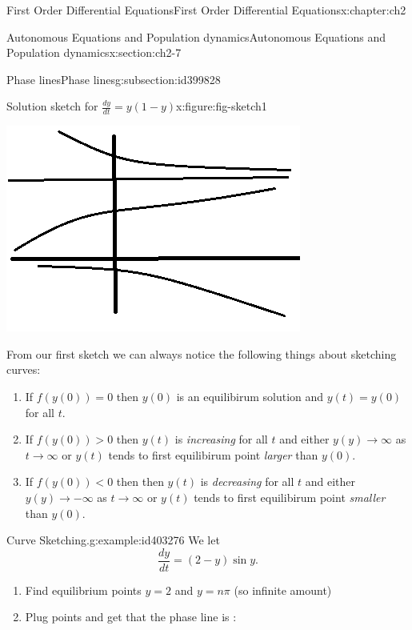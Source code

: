 \documentclass[oneside,10pt,]{book}
\numberwithin{equation}{section}
\numberwithin{equation}{section}
\newcommand{\lt}{<}
\begin{document}
\begin{chapterptx}{First Order Differential Equations}{}{First Order Differential Equations}{}{}{x:chapter:ch2}
\begin{sectionptx}{Autonomous Equations and Population dynamics}{}{Autonomous Equations and Population dynamics}{}{}{x:section:ch2-7}
\begin{subsectionptx}{Phase lines}{}{Phase lines}{}{}{g:subsection:id399828}
\begin{figureptx}{Solution sketch for \(\frac{dy}{dt} = y(1-y)\)}{x:figure:fig-sketch1}{}
\begin{image}{0.3}{0.4}{0.3}
\includegraphics[width=\linewidth]{images/1.6-Sketch1.png}
\end{image}%
\tcblower
\end{figureptx}%
%
\par
From our first sketch we can always notice the following things about sketching curves:%
%
\begin{enumerate}
\item{}If \(f(y(0))=0\) then \(y(0)\) is an equilibirum solution and \(y(t)=y(0)\) for all \(t\).%
\item{}If \(f(y(0))>0\) then \(y(t)\) is \emph{increasing} for all \(t\) and either \(y(y)\to\infty\) as \(t\to\infty\) or \(y(t)\) tends to first equilibirum point \emph{larger} than \(y(0).\)%
\item{}If \(f(y(0))
\lt 0\) then then \(y(t)\) is \emph{decreasing} for all \(t\) and either \(y(y)\to-\infty\) as \(t\to\infty\) or \(y(t)\) tends to first equilibirum point \emph{smaller} than \(y(0).\)%
\end{enumerate}
\begin{example}{Curve Sketching.}{g:example:id403276}%
We let%
\begin{equation*}
\frac{dy}{dt}=(2-y)\sin y.
\end{equation*}
%
%
\begin{enumerate}
\item{}Find equilibrium points \(y=2\) and \(y=n\pi\) (so infinite amount)%
\item{}Plug points and get that the phase line is : \begin{image}{0.35}{0.3}{0.35}%

\end{image}
\end{enumerate}
\end{example}
\end{subsectionptx}
\end{sectionptx}
\end{chapterptx}
\end{document}
